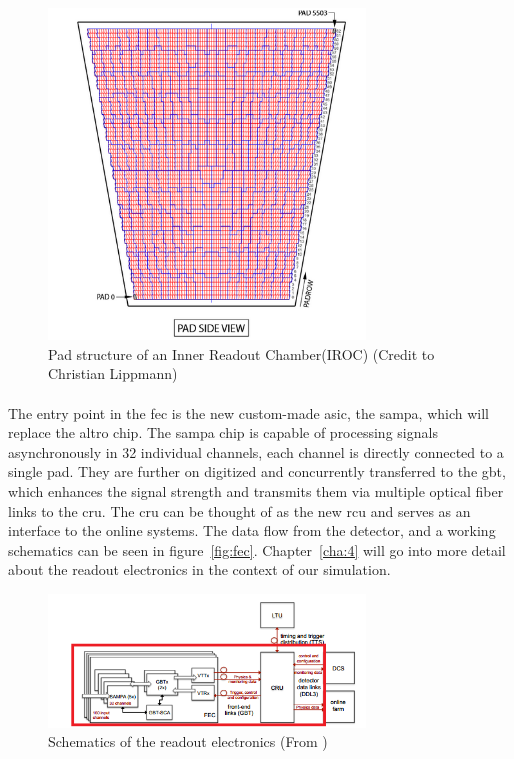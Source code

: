 \documentclass[a4paper, 12pt]{report}
\begin{document}
\begin{figure}[h!]
	\centering
		\includegraphics[width=0.75\textwidth]{images/pad-structure.png}
		\caption{Pad structure of an Inner Readout Chamber(IROC) (Credit to Christian Lippmann)}
		\label{fig:pad-struct}
\end{figure}

\paragraph{}
The entry point in the \gls{fec} is the new custom-made \gls{asic}, the \gls{sampa}, which will replace the \gls{altro} chip\cite{tdr-015}.
The \gls{sampa} chip is capable of processing signals asynchronously in 32 individual channels, each channel is directly connected to a single pad.
They are further on digitized and concurrently transferred to the \gls{gbt}, which enhances the signal strength and transmits them via multiple optical fiber links to the \gls{cru}.
The \gls{cru} can be thought of as the new \gls{rcu} and serves as an interface to the online systems.
The data flow from the detector, and a working schematics can be seen in figure~\ref{fig:fec}.
Chapter~\ref{cha:4} will go into more detail about the readout electronics in the context of our simulation.

\begin{figure}[h!]
	\centering
		\includegraphics[width=0.75\textwidth]{images/fec.png}
		\caption{Schematics of the readout electronics (From \cite{tdr-016})}
		\label{fig:pad-struct}
\end{figure}
\end{document}
